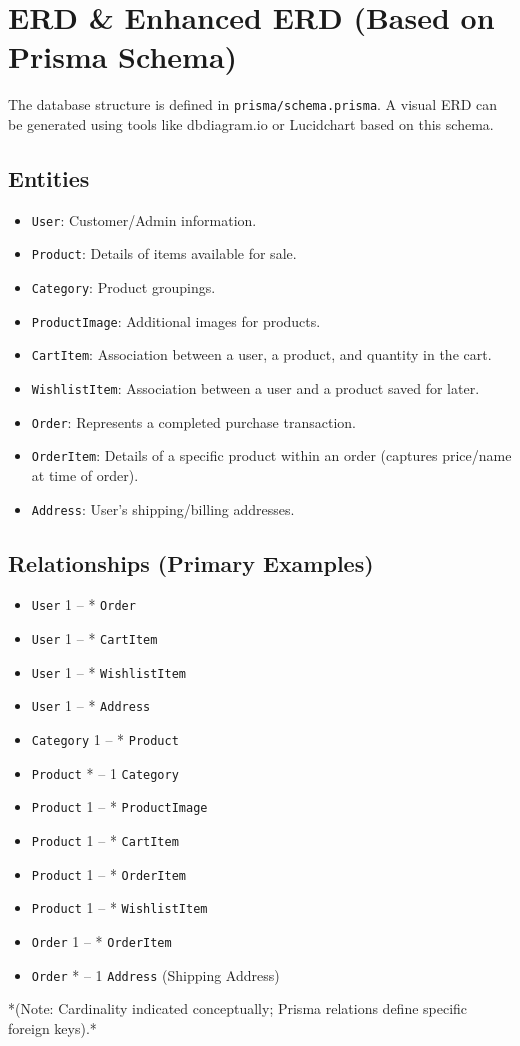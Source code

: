 \documentclass{article}
\begin{document}
\section{ERD \& Enhanced ERD (Based on Prisma Schema)}
The database structure is defined in \texttt{prisma/schema.prisma}. A visual ERD can be generated using tools like dbdiagram.io or Lucidchart based on this schema.

\subsection{Entities}
\begin{itemize}[label=\textbullet]
    \item \texttt{User}: Customer/Admin information.
    \item \texttt{Product}: Details of items available for sale.
    \item \texttt{Category}: Product groupings.
    \item \texttt{ProductImage}: Additional images for products.
    \item \texttt{CartItem}: Association between a user, a product, and quantity in the cart.
    \item \texttt{WishlistItem}: Association between a user and a product saved for later.
    \item \texttt{Order}: Represents a completed purchase transaction.
    \item \texttt{OrderItem}: Details of a specific product within an order (captures price/name at time of order).
    \item \texttt{Address}: User's shipping/billing addresses.
\end{itemize}

\subsection{Relationships (Primary Examples)}
\begin{itemize}[label=\textbullet]
    \item \texttt{User} 1 -- * \texttt{Order}
    \item \texttt{User} 1 -- * \texttt{CartItem}
    \item \texttt{User} 1 -- * \texttt{WishlistItem}
    \item \texttt{User} 1 -- * \texttt{Address}
    \item \texttt{Category} 1 -- * \texttt{Product}
    \item \texttt{Product} * -- 1 \texttt{Category}
    \item \texttt{Product} 1 -- * \texttt{ProductImage}
    \item \texttt{Product} 1 -- * \texttt{CartItem}
    \item \texttt{Product} 1 -- * \texttt{OrderItem}
    \item \texttt{Product} 1 -- * \texttt{WishlistItem}
    \item \texttt{Order} 1 -- * \texttt{OrderItem}
    \item \texttt{Order} * -- 1 \texttt{Address} (Shipping Address)
\end{itemize}
*(Note: Cardinality indicated conceptually; Prisma relations define specific foreign keys).*
\end{document}
